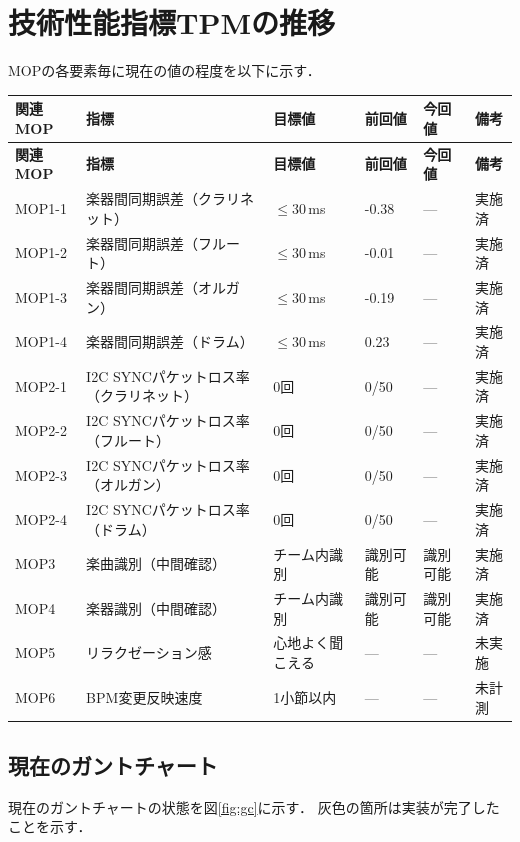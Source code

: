 \documentclass[a4paper,12pt]{ltjsarticle}
\begin{document}
\section{技術性能指標TPMの推移} 
MOPの各要素毎に現在の値の程度を以下に示す．

\begin{longtable}{L{2cm}L{3cm}C{2cm}C{2cm}C{2cm}L{2.5cm}}
  \toprule
  \textbf{関連MOP} & \textbf{指標} & \textbf{目標値} & \textbf{前回値} & \textbf{今回値} & \textbf{備考} \\
  \midrule
  \endfirsthead
  \toprule
  \textbf{関連MOP} & \textbf{指標} & \textbf{目標値} & \textbf{前回値} & \textbf{今回値} & \textbf{備考} \\
  \midrule
  \endhead
  \midrule
  \endfoot
  \bottomrule
  \endlastfoot
  MOP1-1 & 楽器間同期誤差（クラリネット） & $\leq 30$\,ms & -0.38 & --- & 実施済 \\
  MOP1-2 & 楽器間同期誤差（フルート） & $\leq 30$\,ms & -0.01 & --- & 実施済 \\
  MOP1-3 & 楽器間同期誤差（オルガン） & $\leq 30$\,ms & -0.19 & --- & 実施済 \\
  MOP1-4 & 楽器間同期誤差（ドラム） & $\leq 30$\,ms & 0.23 & --- & 実施済 \\
  MOP2-1 & I2C SYNCパケットロス率（クラリネット） & 0回 & 0/50 & --- & 実施済 \\
  MOP2-2 & I2C SYNCパケットロス率（フルート） & 0回 & 0/50 & --- & 実施済 \\
  MOP2-3 & I2C SYNCパケットロス率（オルガン） & 0回 & 0/50 & --- & 実施済 \\
  MOP2-4 & I2C SYNCパケットロス率（ドラム） & 0回 & 0/50 & --- & 実施済 \\
  MOP3 & 楽曲識別（中間確認） & チーム内識別 & 識別可能 & 識別可能 & 実施済 \\
  MOP4 & 楽器識別（中間確認） & チーム内識別 & 識別可能 & 識別可能 & 実施済 \\
  MOP5 & リラクゼーション感 & 心地よく聞こえる & --- & --- & 未実施 \\
  MOP6 & BPM変更反映速度 & 1小節以内 & --- & --- & 未計測 \\
\end{longtable}

\subsection{現在のガントチャート}
現在のガントチャートの状態を図\ref{fig:gc}に示す．
灰色の箇所は実装が完了したことを示す．
\end{document}
